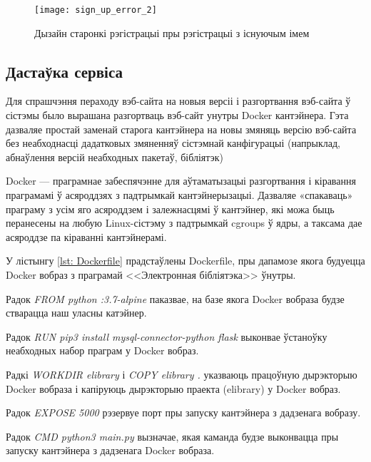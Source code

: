 \begin{figure}[h!]
    \centering
    \texttt{[image: sign\_up\_error\_2]}
    \caption{Дызайн старонкі рэгістрацыі пры рэгістрацыі з існуючым імем}
    \label{img: sign up error 2} 
\end{figure}

\subsection{Дастаўка сервіса}

Для спрашчэння пераходу вэб-сайта на новыя версіі і разгортвання вэб-сайта ў сістэмы было вырашана
разгортваць вэб-сайт унутры Docker кантэйнера. Гэта дазваляе простай заменай старога кантэйнера на новы
змяняць версію вэб-сайта без неабходнасці дадатковых змяненняў сістэмнай канфігурацыі (напрыклад, абнаўлення
версій неабходных пакетаў, бібліятэк)

Docker --- праграмнае забеспячэнне для аўтаматызацыі разгортвання і кіравання праграмамі ў асяроддзях з падтрымкай кантэйнерызацыі. Дазваляе «спакаваць» праграму з усім яго асяроддзем і залежнасцямі ў кантэйнер, які можа быць перанесены на любую Linux-сістэму з падтрымкай cgroups ў ядры, а таксама дае асяроддзе па кіраванні кантэйнерамі.

У лістынгу \ref{lst: Dockerfile} прадстаўлены Dockerfile, пры дапамозе якога будуецца Docker вобраз з
праграмай <<Электронная бібліятэка>> ўнутры.



Радок \textit{FROM python :3.7-alpine} паказвае, на базе якога Docker вобраза будзе стварацца наш
уласны катэйнер.

Радок \textit{RUN pip3 install mysql-connector-python flask} выконвае ўстаноўку неабходных набор праграм у
Docker вобраз.

Радкі \textit{WORKDIR elibrary} і \textit{COPY elibrary .} указваюць працоўную дырэкторыю Docker вобраза і
капіруюць дырэкторыю праекта (elibrary) у Docker вобраз.

Радок \textit{EXPOSE 5000} рэзервуе порт пры запуску кантэйнера з дадзенага вобразу.

Радок \textit{CMD python3 main.py} вызначае, якая каманда будзе выконвацца пры запуску кантэйнера з дадзенага
Docker вобраза.
